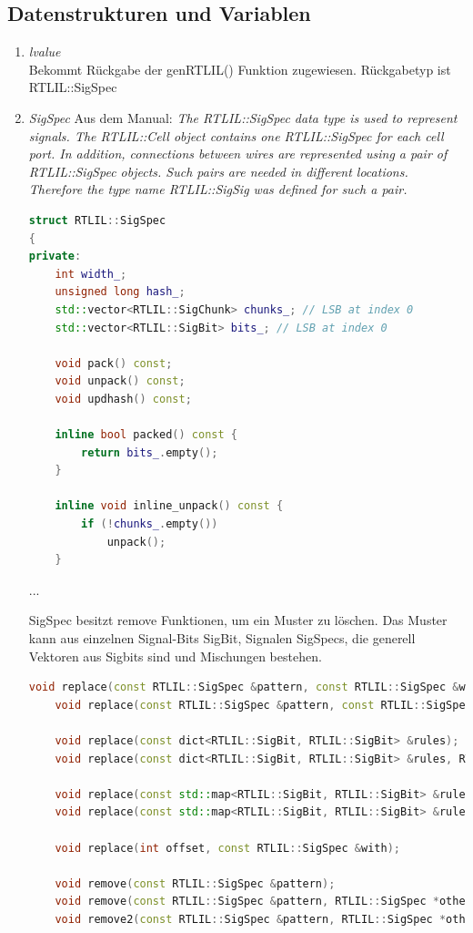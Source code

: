 \documentclass[11pt]{report}
\begin{document}
\subsection{Datenstrukturen und Variablen}
\begin{enumerate}
  \item \textit{lvalue}
\\
Bekommt Rückgabe der genRTLIL() Funktion zugewiesen. Rückgabetyp ist RTLIL::SigSpec
\item \textit{SigSpec}
Aus dem Manual:
\textit{The RTLIL::SigSpec data type is used to represent signals. The RTLIL::Cell object contains one RTLIL::SigSpec
for each cell port.
In addition, connections between wires are represented using a pair of RTLIL::SigSpec objects. Such pairs are needed in different locations. Therefore the type name RTLIL::SigSig was defined for such a pair.}
\begin{lstlisting}[language=C++]
struct RTLIL::SigSpec
{
private:
	int width_;
	unsigned long hash_;
	std::vector<RTLIL::SigChunk> chunks_; // LSB at index 0
	std::vector<RTLIL::SigBit> bits_; // LSB at index 0

	void pack() const;
	void unpack() const;
	void updhash() const;

	inline bool packed() const {
		return bits_.empty();
	}

	inline void inline_unpack() const {
		if (!chunks_.empty())
			unpack();
	}
\end{lstlisting}
...

SigSpec besitzt remove Funktionen, um ein Muster zu löschen. Das Muster kann aus einzelnen Signal-Bits SigBit, Signalen SigSpecs, die generell Vektoren aus Sigbits sind und Mischungen bestehen.

\begin{lstlisting}[language=C++]
	void replace(const RTLIL::SigSpec &pattern, const RTLIL::SigSpec &with);
	void replace(const RTLIL::SigSpec &pattern, const RTLIL::SigSpec &with, RTLIL::SigSpec *other) const;

	void replace(const dict<RTLIL::SigBit, RTLIL::SigBit> &rules);
	void replace(const dict<RTLIL::SigBit, RTLIL::SigBit> &rules, RTLIL::SigSpec *other) const;

	void replace(const std::map<RTLIL::SigBit, RTLIL::SigBit> &rules);
	void replace(const std::map<RTLIL::SigBit, RTLIL::SigBit> &rules, RTLIL::SigSpec *other) const;

	void replace(int offset, const RTLIL::SigSpec &with);

	void remove(const RTLIL::SigSpec &pattern);
	void remove(const RTLIL::SigSpec &pattern, RTLIL::SigSpec *other) const;
	void remove2(const RTLIL::SigSpec &pattern, RTLIL::SigSpec *other);


\end{lstlisting}
\end{enumerate}
\end{document}
